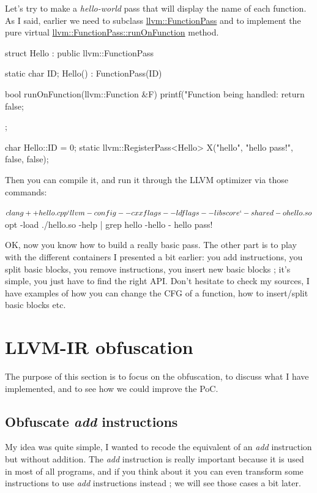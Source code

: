 \documentclass[a4paper, 11pt, notitlepage]{report}
\begin{document}
Let's try to make a \textit{hello-world} pass that will display the name of each function. As I said, earlier we need to subclass \href{https://llvm.org/viewvc/llvm-project/llvm/trunk/include/llvm/Pass.h?view=markup}{llvm::FunctionPass} and to implement the pure virtual \href{https://llvm.org/viewvc/llvm-project/llvm/trunk/include/llvm/Pass.h?view=markup}{llvm::FunctionPass::runOnFunction} method.

\begin{cppcode}
struct Hello : public llvm::FunctionPass
{
    static char ID;
    Hello()
    : FunctionPass(ID)
    {}

    bool runOnFunction(llvm::Function &F)
    {
        printf("Function being handled: %
        return false;
    }
};

char Hello::ID = 0;
static llvm::RegisterPass<Hello> X("hello", "hello pass!", false, false);
\end{cppcode}

Then you can compile it, and run it through the LLVM optimizer via those commands:
\begin{consolecode}
$ clang++ hello.cpp `llvm-config --cxxflags --ldflags --libs core` -shared -o hello.so
$ opt -load ./hello.so -help | grep hello
    -hello                                     - hello pass!
\end{consolecode}

OK, now you know how to build a really basic pass. The other part is to play with the different containers I presented a bit earlier: you add instructions, you split basic blocks, you remove instructions, you insert new basic blocks ; it's simple, you just have to find the right API. Don't hesitate to check my sources, I have examples of how you can change the CFG of a function, how to insert/split basic blocks etc.

\section{LLVM-IR obfuscation}
The purpose of this section is to focus on the obfuscation, to discuss what I have implemented, and to see how we could improve the PoC.
\subsection{Obfuscate \textit{add} instructions}
My idea was quite simple, I wanted to recode the equivalent of an \textit{add} instruction but without addition. The \textit{add} instruction is really important because it is used in most of all programs, and if you think about it you can even transform some instructions to use \textit{add} instructions instead ; we will see those cases a bit later. 
\end{document}
